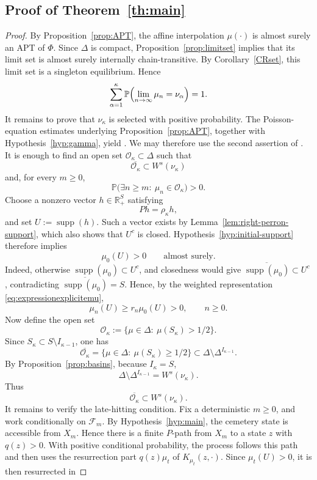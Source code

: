 \documentclass[10pt,letterpaper]{article}
\theoremstyle{compactplain}
\theoremstyle{compactdefinition}
\DeclareMathOperator{\supp}{supp}
\renewcommand{\Pr}{\mathbb P}
\newcommand{\1}{\mathds{1}}
\begin{document}
\subsection{Proof of Theorem~\ref{th:main}}
\begin{proof}
By Proposition~\ref{prop:APT}, the affine interpolation \(\mu(\cdot)\) is
almost surely an APT of \(\Phi\). Since \(\Delta\) is compact, Proposition~\ref{prop:limitset} implies that its limit set is almost surely internally chain-transitive. By Corollary~\ref{CRset}, this limit set is a
singleton equilibrium. Hence
\[
\sum_{\alpha=1}^{\kappa}
\Pr\Bigl(\lim_{n\to\infty}\mu_n=\nu_\alpha\Bigr)=1.
\]
It remains to prove that \(\nu_\kappa\) is selected with positive probability. The Poisson-equation estimates underlying Proposition~\ref{prop:APT},
together with Hypothesis~\ref{hyp:gamma}, yield
\cite[condition~(24)]{B99}. We may therefore use the second assertion of
\cite[Theorem~7.3]{B99}. It is enough to find an open set
\(\mathcal O_\kappa\subset\Delta\) such that
\[
\overline{\mathcal O_\kappa}\subset W^s(\nu_\kappa)
\]
and, for every \(m\geq0\),
\[
\mathbb P\bigl(\exists n\geq m:\ \mu_n\in\mathcal O_\kappa\bigr)>0.
\]
Choose a nonzero vector \(h\in\mathbb R_+^S\) satisfying
\[
Ph=\rho_\kappa h,
\]
and set \(U:=\supp(h)\). Such a vector exists by
Lemma~\ref{lem:right-perron-support}, which also shows that \(U^c\) is closed.
Hypothesis~\ref{hyp:initial-support} therefore implies
\[
\mu_0(U)>0
\qquad\text{almost surely}.
\]
Indeed, otherwise \(\supp(\mu_0)\subset U^c\), and closedness would give
\(\overline{\supp(\mu_0)}\subset U^c\), contradicting
\(\overline{\supp(\mu_0)}=S\). Hence, by the weighted representation
\eqref{eq:expressionexplicitemu},
\[
\mu_n(U)\geq r_n\mu_0(U)>0,
\qquad n\geq0.
\]
Now define the open set
\[
\mathcal O_\kappa
:=
\{\mu\in\Delta:\ \mu(S_\kappa)>1/2\}.
\]
Since \(S_\kappa\subset S\setminus I_{\kappa-1}\), one has
\[
\overline{\mathcal O_\kappa}
=
\{\mu\in\Delta:\ \mu(S_\kappa)\geq1/2\}
\subset
\Delta\setminus\Delta^{I_{\kappa-1}}.
\]
By Proposition~\ref{prop:basins}, because \(I_\kappa=S\),
\[
\Delta\setminus\Delta^{I_{\kappa-1}}
=
W^s(\nu_\kappa).
\]
Thus
\[
\overline{\mathcal O_\kappa}\subset W^s(\nu_\kappa).
\]
It remains to verify the late-hitting condition. Fix a
deterministic \(m\geq0\), and work conditionally on \(\mathcal F_m\). By
Hypothesis~\ref{hyp:main}, the cemetery state is accessible from \(X_m\). Hence there is a finite \(P\)-path from \(X_m\) to a state \(z\) with
\(q(z)>0\). With positive conditional probability, the process follows this
path and then uses the resurrection part \(q(z)\mu_t\) of \(K_{\mu_t}(z,\cdot)\). Since \(\mu_t(U)>0\), it is then resurrected in

\end{proof}
\end{document}
